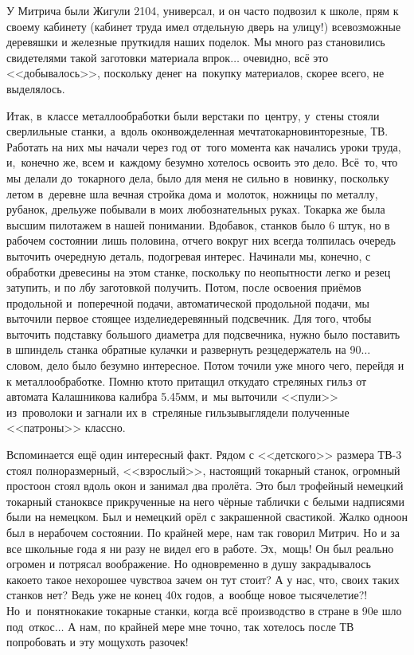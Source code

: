 У Митрича были Жигули 2104, универсал, и он часто подвозил к школе, прям к своему кабинету (кабинет труда имел отдельную дверь на улицу!) всевозможные деревяшки и железные прутки\mdash для наших поделок. Мы много раз становились свидетелями такой заготовки материала впрок$\ldots$ очевидно, всё это <<добывалось>>, поскольку денег на~покупку материалов, скорее всего, не выделялось.

Итак, в~классе металлообработки были верстаки по~центру, у~стены стояли сверлильные станки, а~вдоль окон\mdash вожделенная мечта\mdash токарно\sdash винторезные, ТВ. Работать на них мы начали через год от~того момента как начались уроки труда, и,~конечно же, всем и~каждому безумно хотелось освоить это дело. Всё~то, что мы делали до~токарного дела, было для меня не сильно в~новинку, поскольку летом в~деревне шла вечная стройка дома и~молоток, ножницы по металлу, рубанок, дрель\mdash уже побывали в моих любознательных руках. Токарка же была высшим пилотажем в нашей понимании. Вдобавок, станков было 6 штук, но в рабочем состоянии лишь половина, отчего вокруг них всегда толпилась очередь выточить очередную деталь, подогревая интерес. Начинали мы, конечно, с обработки древесины на этом станке, поскольку по неопытности легко и резец затупить, и по лбу заготовкой получить. Потом, после освоения приёмов продольной и~поперечной подачи, автоматической продольной подачи, мы выточили первое стоящее изделие\mdash деревянный подсвечник. Для того, чтобы выточить подставку большого диаметра для подсвечника, нужно было поставить в шпиндель станка обратные кулачки и развернуть резцедержатель на 90\degree$\ldots$ словом, дело было безумно интересное. Потом точили уже много чего, перейдя и к металлообработке. Помню кто\sdash то притащил откуда\sdash то стреляных гильз от автомата Калашникова калибра 5.45\thinspace мм, и~мы выточили <<пули>> из~проволоки и загнали их в~стреляные гильзы\mdash выглядели полученные <<патроны>> классно. 

Вспоминается ещё один интересный факт. Рядом с <<детского>> размера ТВ-3 стоял полноразмерный, <<взрослый>>, настоящий токарный станок, огромный просто\mdash он стоял вдоль окон и занимал два пролёта. Это был трофейный немецкий токарный станок\mdash все прикрученные на него чёрные таблички с белыми надписями были на немецком. Был и немецкий орёл с закрашенной свастикой. Жалко одно\mdash он был в нерабочем состоянии. По крайней мере, нам так говорил Митрич. Но и за все школьные года я ни разу не видел его в работе. Эх,~мощь! Он был реально огромен и потрясал воображение. Но одновременно в душу закрадывалось какое\sdash то такое нехорошее чувство\mdash а зачем он тут стоит? А у нас, что, своих таких станков нет? Ведь уже не конец 40\sdash х годов, а~вообще новое тысячелетие?! Но~и~понятно\mdash какие токарные станки, когда всё производство в стране в 90\sdash е шло под~откос$\ldots$ А нам, по крайней мере мне точно, так хотелось после ТВ попробовать и эту мощу\mdash хоть разочек! 

